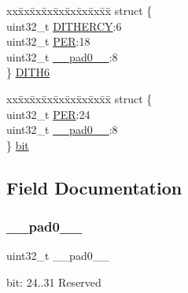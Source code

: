 \begin{DoxyCompactItemize}
\begin{tabbing}
\end{tabbing}\item 
\begin{tabbing}
xx\=xx\=xx\=xx\=xx\=xx\=xx\=xx\=xx\=\kill
struct \{\\
\>uint32\_t \mbox{\hyperlink{union_t_c_c___p_e_r___type_a1e7fc84641e39de898f29ee9268f22aa}{DITHERCY}}:6\\
\>uint32\_t \mbox{\hyperlink{union_t_c_c___p_e_r___type_a3a85cb8e507302b97a36eaf1c13d0b72}{PER}}:18\\
\>uint32\_t \mbox{\hyperlink{union_t_c_c___p_e_r___type_a3e57c2ef1c3ffb36722f000cc1156824}{\_\_pad0\_\_}}:8\\
\} \mbox{\hyperlink{union_t_c_c___p_e_r___type_a61a567897ac99cb505feb4d7a5fdd8e1}{DITH6}}\\

\end{tabbing}\item 
\begin{tabbing}
xx\=xx\=xx\=xx\=xx\=xx\=xx\=xx\=xx\=\kill
struct \{\\
\>uint32\_t \mbox{\hyperlink{union_t_c_c___p_e_r___type_a3a85cb8e507302b97a36eaf1c13d0b72}{PER}}:24\\
\>uint32\_t \mbox{\hyperlink{union_t_c_c___p_e_r___type_a3e57c2ef1c3ffb36722f000cc1156824}{\_\_pad0\_\_}}:8\\
\} \mbox{\hyperlink{union_t_c_c___p_e_r___type_a9755b31cde416d30b711c3fd2cbcd0f8}{bit}}\\

\end{tabbing}\end{DoxyCompactItemize}


\subsection{Field Documentation}
\mbox{\label{union_t_c_c___p_e_r___type_a3e57c2ef1c3ffb36722f000cc1156824}} 
\subsubsection{\texorpdfstring{\_\_pad0\_\_}{\_\_pad0\_\_}}
{\footnotesize\ttfamily uint32\+\_\+t \+\_\+\+\_\+pad0\+\_\+\+\_\+}

bit\+: 24..31 Reserved \mbox{\label{union_t_c_c___p_e_r___type_aa242d9c894154defbbbb26c7b1dce5bf}} 
